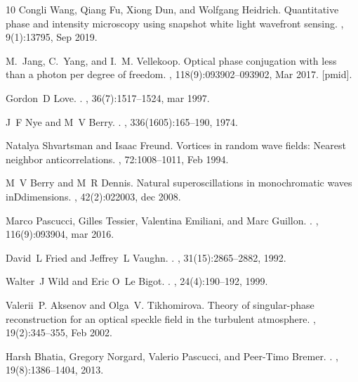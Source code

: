 \documentclass[10pt,twocolumn,twoside,letterpaper]{article}
\begin{document}
\begin{thebibliography}{10}
Congli Wang, Qiang Fu, Xiong Dun, and Wolfgang Heidrich.
\newblock Quantitative phase and intensity microscopy using snapshot white
  light wavefront sensing.
, 9(1):13795, Sep 2019.

M.~Jang, C.~Yang, and I.~M. Vellekoop.
\newblock Optical phase conjugation with less than a photon per degree of
  freedom.
, 118(9):093902--093902, Mar 2017.
[pmid].

Gordon~D Love.
.
, 36(7):1517--1524, mar 1997.

J~F Nye and M~V Berry.
.
,
  336(1605):165--190, 1974.

Natalya Shvartsman and Isaac Freund.
\newblock Vortices in random wave fields: Nearest neighbor anticorrelations.
, 72:1008--1011, Feb 1994.

M~V Berry and M~R Dennis.
\newblock Natural superoscillations in monochromatic waves {inDdimensions}.
,
  42(2):022003, dec 2008.

Marco Pascucci, Gilles Tessier, Valentina Emiliani, and Marc Guillon.
.
, 116(9):093904, mar 2016.

David~L Fried and Jeffrey~L Vaughn.
.
, 31(15):2865--2882, 1992.

Walter~J Wild and Eric O~Le Bigot.
.
, 24(4):190--192, 1999.

Valerii~P. Aksenov and Olga~V. Tikhomirova.
\newblock Theory of singular-phase reconstruction for an optical speckle field
  in the turbulent atmosphere.
, 19(2):345--355, Feb 2002.

Harsh Bhatia, Gregory Norgard, Valerio Pascucci, and Peer-Timo Bremer.
.
, 19(8):1386--1404, 2013.


\end{thebibliography}
\end{document}
